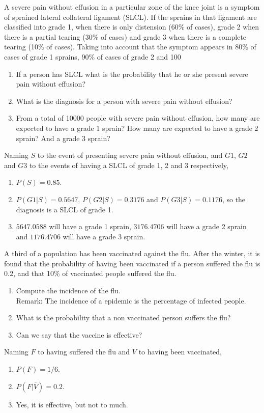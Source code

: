 {A severe pain without effusion in a particular zone of the knee joint is a symptom of sprained lateral collateral ligament (SLCL). 
If the sprains in that ligament are classified into grade 1, when there is only distension (60\% of cases), grade 2 when there is a partial tearing (30\% of cases) and grade 3 when there is a complete tearing (10\% of cases). 
Taking into account that the symptom appears in 80\% of cases of grade 1 sprains, 90\% of cases of grade 2 and 100%
\begin{enumerate}
\item If a person has SLCL what is the probability that he or she present severe pain without effusion?
\item What is the diagnosis for a person with severe pain without effusion?
\item From a total of 10000 people with severe pain without effusion, how many are expected to have a grade 1 sprain? How many are expected to have a grade 2 sprain? And a grade 3 sprain?
\end{enumerate}
}
{Naming $S$ to the event of presenting severe pain without effusion, and $G1$, $G2$ and $G3$ to the events of having a SLCL of grade 1, 2 and 3 respectively, 
\begin{enumerate}
\item $P(S)=0.85$.
\item $P(G1|S)=0.5647$, $P(G2|S)=0.3176$ and $P(G3|S)=0.1176$, so the diagnosis is a SLCL of grade 1. 
\item $5647.0588$ will have a grade 1 sprain, $3176.4706$ will have a grade 2 sprain and $1176.4706$ will have a grade 3 sprain.
\end{enumerate}
}
{}


{A third of a population has been vaccinated against the flu.
After the winter, it is found that the probability of having been vaccinated if a person suffered the flu is $0.2$, and that 10\% of vaccinated people suffered the flu.
\begin{enumerate}
\item Compute the incidence of the flu.\\
Remark: The incidence of a epidemic is the percentage of infected people.
\item What is the probability that a non vaccinated person suffers the flu?
\item Can we say that the vaccine is effective?
\end{enumerate}
}
{Naming $F$ to having suffered the flu and $V$ to having been vaccinated,
\begin{enumerate}
\item $P(F)=1/6$.
\item $P(F|\overline{V})=0.2$.
\item Yes, it is effective, but not to much. 
\end{enumerate}
}
{}


